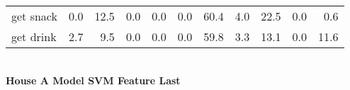 \documentclass{article}
\begin{document}
\begin{sideways}
\begin{tabular}{lrrrrrrrrrr}
get snack         &         0.0 &               12.5 &               0.0 &                0.0 &                0.0 &             60.4 &                      4.0 &                  22.5 &              0.0 &              0.6 \\
get drink         &         2.7 &                9.5 &               0.0 &                0.0 &                0.0 &             59.8 &                      3.3 &                  13.1 &              0.0 &             11.6 \\
\bottomrule
\end{tabular}
\end{sideways}
\normalsize
\vspace{1cm}\\
\textbf{House A Model SVM Feature Last}\\
\vspace{1cm}\\
\end{document}
